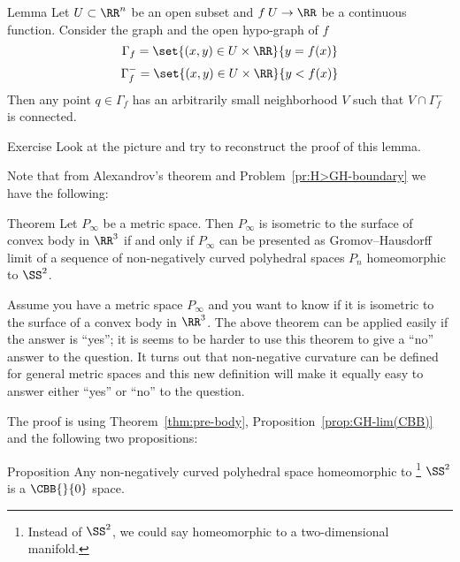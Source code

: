 \begin{thm}{Lemma}
Let $U\subset \RR^n$ be an open subset and $f\:U\to\RR$ be a continuous function.
Consider the graph and the open hypo-graph of $f$
$$
\Gamma_f
=
\set{(x,y)\in U\times \RR }{y=f(x)}
$$
$$
\Gamma^-_f
=
\set{(x,y)\in U\times \RR }{y<f(x)}
$$
Then any point $q\in\Gamma_f$ has an arbitrarily small neighborhood $V$ 
such that $V\cap \Gamma^-_f$ is connected.
\end{thm}


\begin{thm}{Exercise}
Look at the picture and
try to reconstruct the proof of this lemma.
\end{thm}










Note that from Alexandrov's theorem and Problem~\ref{pr:H>GH-boundary} we have the following:

\begin{thm}{Theorem}\label{thm:pre-body}
Let $P_\infty$ be a metric space.
Then $P_\infty$ is isometric to the surface of convex body in $\RR^3$
if and only if $P_\infty$ can be presented as Gromov--Hausdorff limit of a sequence of non-negatively curved polyhedral spaces $P_n$ homeomorphic to $\SS^2$.
\end{thm}

Assume you have  a metric space $P_\infty$ and you want to know if it is isometric to the surface of a convex body in $\RR^3$.
The above theorem can be applied easily if the answer is ``yes'';
it is seems to be harder to use this theorem to give a ``no'' answer to the question.
It turns out that non-negative curvature can be defined for general metric spaces
and this new definition will make it equally easy to answer either ``yes'' or ``no'' to the question.



The proof is using 
Theorem~\ref{thm:pre-body}, 
Proposition~\ref{prop:GH-lim(CBB)} and the following two propositions:

\begin{thm}{Proposition}\label{prop:poly-in-cbb}
Any non-negatively curved polyhedral space homeomorphic to%
\footnote{Instead of $\SS^2$, we could say homeomorphic to a two-dimensional manifold.} 
$\SS^2$ is a $\CBB{}{0}$ space. 
\end{thm}











